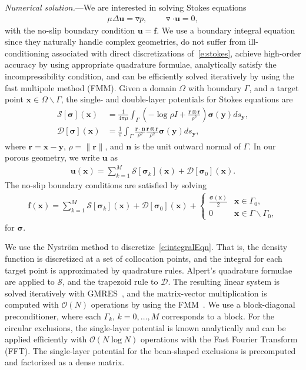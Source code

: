\documentclass[twocolumn,showpacs,pre,preprintnumbers,floatfix]{revtex4-1}
\newcommand{\ff}{{\mathbf{f}}}
\newcommand{\nn}{{\mathbf{n}}}
\newcommand{\rr}{{\mathbf{r}}}
\newcommand{\ssigma}{{\boldsymbol{\sigma}}}
\newcommand{\uu}{{\mathbf{u}}}
\newcommand{\xx}{{\mathbf{x}}}
\newcommand{\yy}{{\mathbf{y}}}
\newcommand{\grad}{{\triangledown}}
\newcommand{\bigO}{{\mathcal{O}}}
\renewcommand{\SS}{{\mathcal{S}}}
\newcommand{\DD}{{\mathcal{D}}}
\begin{document}
{\em Numerical solution.}---We are interested in solving Stokes
equations
\begin{align}
  \mu \Delta \uu  = \grad p, \qquad \grad \cdot \uu = 0,
  \label{e:stokes}
\end{align}
with the no-slip boundary condition $\uu = \ff$.  We use a boundary
integral equation since they naturally handle complex geometries, do
not suffer from ill-conditioning associated with direct discretizations
of~\eqref{e:stokes}, achieve high-order accuracy by using appropriate
quadrature formulae, analytically satisfy the incompressibility
condition, and can be efficiently solved iteratively by using the fast
multipole method (FMM).  Given a domain $\Omega$ with boundary
$\Gamma$, and a target point $\xx \in \Omega \backslash \Gamma$, the
single- and double-layer potentials for Stokes equations
are~\cite{poz1992}
\begin{align}
  \SS[\ssigma](\xx) &= \frac{1}{4\pi\mu}\int_{\Gamma} \left(
  -\log\rho I + \frac{\rr \otimes\rr}{\rho^{2}} 
  \right)\ssigma(\yy)ds_{\yy},  \\
  \DD[\ssigma](\xx) &= \frac{1}{\pi}\int_{\Gamma} 
  \frac{\rr \cdot \nn}{\rho^{2}}\frac{\rr \otimes \rr}{\rho^{2}}
  \ssigma(\yy)ds_{\yy},
\end{align}
where $\rr = \xx - \yy$, $\rho = \|\rr\|$, and $\nn$ is the unit outward
normal of $\Gamma$.  In our porous geometry, we write $\uu$ as
\begin{align}
  \uu(\xx) = \sum_{k=1}^{M} \SS[\ssigma_{k}](\xx) + 
    \DD[\ssigma_{0}](\xx).
  \label{e:integralRep}
\end{align}
The no-slip boundary conditions are satisfied by solving 
\begin{align}
  \ff(\xx) = \sum_{k=1}^{M} \SS[\ssigma_{k}](\xx) + 
    \DD[\ssigma_{0}](\xx) + 
    \left\{
    \begin{array}{cl}
      \frac{\ssigma(\xx)}{2} & \xx \in \Gamma_{0}, \\
      0 & \xx \in \Gamma \backslash \Gamma_{0},
    \end{array}
    \right.
    \label{e:integralEqn}
\end{align}
for $\ssigma$.

We use the Nystr\"{o}m method to discretize~\eqref{e:integralEqn}.  That
is, the density function is discretized at a set of collocation points,
and the integral for each target point is approximated by quadrature
rules.  Alpert's quadrature formulae~\cite{alp1999} are applied to
$\SS$, and the trapezoid rule to $\DD$.  The resulting linear system is
solved iteratively with GMRES~\cite{saa:sch1986}, and the matrix-vector
multiplication is computed with $\bigO(N)$ operations by using the
FMM~\cite{cmcl2012}.  We use a block-diagonal preconditioner, where each
$\Gamma_{k}$, $k=0,\ldots,M$ corresponds to a block.  For the circular
exclusions, the single-layer potential is known analytically and can be
applied efficiently with $\bigO(N \log N)$ operations with the Fast Fourier
Transform (FFT).  The single-layer potential for the bean-shaped
exclusions is precomputed and factorized as a dense matrix.
\end{document}
